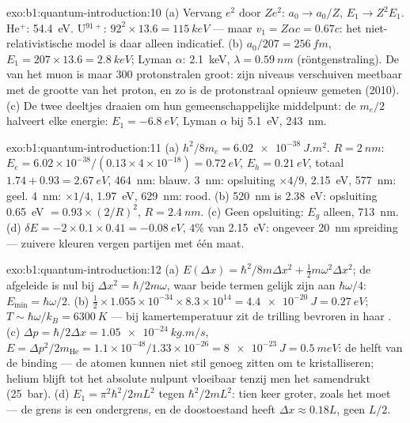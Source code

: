 \begin{solution}{exo:b1:quantum-introduction:10}
(a) Vervang $e^2$ door $Ze^2$: $a_0 \to a_0/Z$, $E_1 \to Z^2E_1$. He$^+$:
\qty{54.4}{eV}. U$^{91+}$: $92^2 \times 13.6 = \qty{115}{keV}$ --- maar $v_1 = Z\alpha c
= 0.67c$: het niet-relativistische model is daar alleen indicatief. (b) $a_0/207
= \qty{256}{fm}$, $E_1 = 207 \times 13.6 = \qty{2.8}{keV}$; Lyman $\alpha$:
\qty{2.1}{keV}, $\lambda = \qty{0.59}{nm}$ (röntgenstraling). De  van het muon is maar
$300$ protonstralen groot: zijn niveaus verschuiven meetbaar met de grootte van het proton,
en zo is de protonstraal opnieuw gemeten (2010). (c) De twee
deeltjes draaien om hun gemeenschappelijke middelpunt: de  $m_e/2$ halveert
elke energie: $E_1 = \qty{-6.8}{eV}$, Lyman $\alpha$ bij \qty{5.1}{eV}, \qty{243}{nm}.
\end{solution}

\begin{solution}{exo:b1:quantum-introduction:11}
(a) $h^2/8m_e = \qty{6.02e-38}{J.m^2}$. $R = \qty{2}{nm}$: $E_e = 6.02 \times 10^{-38}/
(0.13 \times 4 \times 10^{-18}) = \qty{0.72}{eV}$, $E_h = \qty{0.21}{eV}$, totaal $1.74 +
0.93 = \qty{2.67}{eV}$, \qty{464}{nm}: blauw. \qty{3}{nm}: opsluiting $\times4/9$,
\qty{2.15}{eV}, \qty{577}{nm}: geel. \qty{4}{nm}: $\times1/4$, \qty{1.97}{eV},
\qty{629}{nm}: rood. (b) \qty{520}{nm} is \qty{2.38}{eV}: opsluiting \qty{0.65}{eV}
$= 0.93 \times (2/R)^2$, $R = \qty{2.4}{nm}$. (c) Geen opsluiting: $E_g$ alleen,
\qty{713}{nm}. (d) $\delta E = -2 \times 0.1 \times 0.41 = \qty{-0.08}{eV}$, $4\%$ van
\qty{2.15}{eV}: ongeveer \qty{20}{nm} spreiding --- zuivere kleuren vergen
partijen met één maat.
\end{solution}

\begin{solution}{exo:b1:quantum-introduction:12}
(a) $E(\Delta x) = \hbar^2/8m\Delta x^2 + \tfrac12m\omega^2\Delta x^2$; de afgeleide is nul bij
$\Delta x^2 = \hbar/2m\omega$, waar beide termen gelijk zijn aan $\hbar\omega/4$: $E_{\min} =
\hbar\omega/2$. (b) $\tfrac12 \times 1.055 \times 10^{-34} \times 8.3 \times 10^{14} = \qty{4.4e-20}{J}
= \qty{0.27}{eV}$; $T \sim \hbar\omega/k_B = \qty{6300}{K}$ --- bij kamertemperatuur
zit de trilling bevroren in haar . (c) $\Delta p = \hbar/2\Delta x =
\qty{1.05e-24}{kg.m/s}$, $E = \Delta p^2/2m_{\mathrm{He}} = 1.1 \times 10^{-48}/1.33 \times
10^{-26} = \qty{8e-23}{J} = \qty{0.5}{meV}$: de helft van de binding --- de atomen kunnen
niet stil genoeg zitten om te kristalliseren; helium blijft tot het absolute
nulpunt vloeibaar tenzij men het samendrukt (\qty{25}{bar}). (d) $E_1 = \pi^2\hbar^2/2mL^2$ tegen
$\hbar^2/2mL^2$: tien keer groter, zoals het moet --- de grens is een ondergrens,
en de doostoestand heeft $\Delta x \approx 0.18L$, geen $L/2$.
\end{solution}

